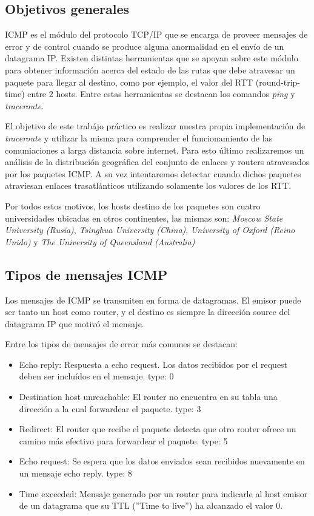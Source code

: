 \subsection{Objetivos generales}

ICMP es el m\'odulo del protocolo TCP/IP que se encarga de proveer mensajes de error y de control cuando
se produce alguna anormalidad en el env\'io de un datagrama IP. Existen distintas herramientas
que se apoyan sobre este m\'odulo para obtener informaci\'on acerca del estado de las rutas que
debe atravesar un paquete para llegar al destino, como por ejemplo, el valor del RTT (round-trip-time)
entre 2 hosts. Entre estas herramientas se destacan los comandos \emph{ping} y \emph{traceroute}.

El objetivo de este trab\'ajo pr\'actico es realizar nuestra propia
implementaci\'on de \emph{traceroute} y utilizar la misma para comprender el
funcionamiento de las comuniaciones a larga distancia sobre internet.
Para esto \'ultimo realizaremos un an\'alisis de la distribuci\'on 
geogr\'afica del conjunto de enlaces y routers atravesados por los paquetes
ICMP.
A su vez intentaremos detectar cuando dichos paquetes atraviesan enlaces
trasatl\'anticos utilizando solamente los valores de los RTT.

Por todos estos motivos, los hosts destino de los paquetes son cuatro universidades ubicadas en 
otros continentes, las mismas son: \emph{Moscow State University (Rusia)}, \emph{Tsinghua University (China)},
\emph{University of Oxford (Reino Unido)} y \emph{The University of Queensland (Australia)}


\subsection{Tipos de mensajes ICMP}

Los mensajes de ICMP se transmiten en forma de datagramas. El emisor puede ser tanto un host como router,
y el destino es siempre la direcci\'on source del datagrama IP que motiv\'o el mensaje.

Entre los tipos de mensajes de error m\'as comunes se destacan:
\begin{itemize}
  \item Echo reply: Respuesta a echo request. Los datos recibidos por el request deben ser inclu\'idos
  en el mensaje. type: 0
  \item Destination host unreachable: El router no encuentra en su tabla una direcci\'on a la cual
  forwardear el paquete. type: 3
  \item Redirect: El router que recibe el paquete detecta que otro router ofrece un camino m\'as
  efectivo para forwardear el paquete. type: 5
  \item Echo request: Se espera que los datos enviados sean recibidos nuevamente en un mensaje echo
  reply. type: 8
  \item Time exceeded: Mensaje generado por un router para indicarle al host emisor de un datagrama
  que su TTL (''Time to live'') ha alcanzado el valor 0.

\end{itemize}


